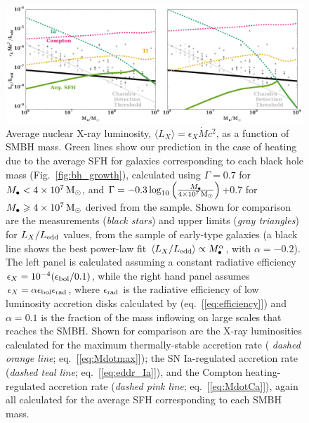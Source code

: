 \documentclass[usenatbib,fleqn]{mn2e}
\newcommand{\Mdot}{\dot{M}}
\newcommand{\Mbh}[1][]{M_{\bullet#1}}
\begin{document}
\begin{figure}
\includegraphics[width=\textwidth]{miller.pdf}
\caption{\label{fig:miller} Average nuclear X-ray luminosity, $\langle
  L_X \rangle = \epsilon_X \Mdot c^2$, as a function of SMBH mass.
  Green lines show our prediction in the case of heating due to the
  average SFH for galaxies corresponding to each black hole mass
  (Fig.~\ref{fig:bh_growth}), calculated using $\Gamma = 0.7$ for
  $\Mbh < 4 \times 10^7 \Msun$, and $\Gamma=-0.3 \log_{10}
  \left(\frac{\Mbh}{4\times 10^7 \Msun}\right)$+0.7 for $\Mbh \geq 4
  \times 10^7 \Msun$ derived from the \citet{LauerFaber+:2007a}
  sample.  Shown for comparison are the measurements ({\it black
    stars}) and upper limits ({\it gray triangles}) for $L_X/L_{\rm
    edd}$ values, from the \citet{Miller+15} sample of early-type
  galaxies (a black line shows the best power-law fit $\langle
  L_X/L_{\rm edd}\rangle \propto M_{\bullet}^{\alpha}$, with $\alpha =
  -0.2$).  The left panel is calculated assuming a constant radiative
  efficiency $\epsilon_X=10^{-4} (\epsilon_{\rm bol}/0.1)$, while the
  right hand panel assumes $\epsilon_X= \alpha \epsilon_{\rm
    bol}\epsilon_{\rm rad}$, where $\epsilon_{\rm rad}$ is the
  radiative efficiency of low luminosity accretion disks calculated by
  \citet{Sharma+2007} (eq.~[\ref{eq:efficiency}]) and $\alpha = 0.1$
  is the fraction of the mass inflowing on large scales that reaches
  the SMBH.  Shown for comparison are the X-ray luminosities
  calculated for the maximum thermally-stable accretion rate ({\it
    dashed orange line}; eq.~[\ref{eq:Mdotmax}]); the SN Ia-regulated
  accretion rate ({\it dashed teal line}; eq.~[\ref{eq:eddr_Ia}]), and
  the Compton heating-regulated accretion rate ({\it dashed pink
    line}; eq.~[\ref{eq:MdotCa}]), again all calculated for the
  average SFH corresponding to each SMBH mass.}
\end{figure}
\end{document}
